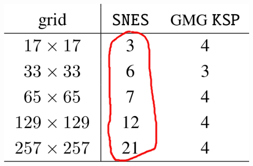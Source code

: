\documentclass[svgnames,
               hyperref={colorlinks,citecolor=DeepPink4,linkcolor=FireBrick,urlcolor=Maroon},
               usepdftitle=false]  %
               {beamer}
\begin{document}
\begin{frame}[fragile]
\vspace{-20mm}
\hfill \includegraphics[height=0.25\textheight]{images/vi-newton-gmg-bad.png}
\end{frame}
\end{document}
